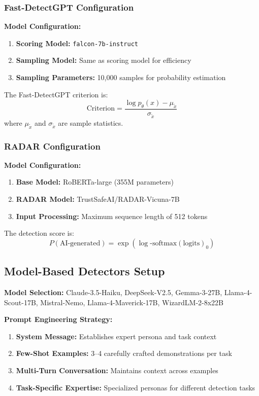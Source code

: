 \subsubsection{Fast-DetectGPT Configuration}
\textbf{Model Configuration:}
\begin{enumerate}[nosep]
    \item \textbf{Scoring Model:} \texttt{falcon-7b-instruct}
    \item \textbf{Sampling Model:} Same as scoring model for efficiency
    \item \textbf{Sampling Parameters:} 10,000 samples for probability estimation
\end{enumerate}

The Fast-DetectGPT criterion is:
\begin{equation}
\text{Criterion} = \frac{\log p_{\theta}(x) - \mu_{\tilde{x}}}{\sigma_{\tilde{x}}}
\end{equation}
where $\mu_{\tilde{x}}$ and $\sigma_{\tilde{x}}$ are sample statistics.

\subsubsection{RADAR Configuration}
\textbf{Model Configuration:}
\begin{enumerate}[nosep]
    \item \textbf{Base Model:} RoBERTa-large (355M parameters)
    \item \textbf{RADAR Model:} TrustSafeAI/RADAR-Vicuna-7B
    \item \textbf{Input Processing:} Maximum sequence length of 512 tokens
\end{enumerate}

The detection score is:
\begin{equation}
P(\text{AI-generated}) = \exp(\log\text{-softmax}(\text{logits})_0)
\end{equation}

\subsection{Model-Based Detectors Setup}

\textbf{Model Selection:} Claude-3.5-Haiku, DeepSeek-V2.5, Gemma-3-27B, Llama-4-Scout-17B, Mistral-Nemo, Llama-4-Maverick-17B, WizardLM-2-8x22B

\textbf{Prompt Engineering Strategy:}
\begin{enumerate}
    \item \textbf{System Message:} Establishes expert persona and task context
    \item \textbf{Few-Shot Examples:} 3--4 carefully crafted demonstrations per task
    \item \textbf{Multi-Turn Conversation:} Maintains context across examples
    \item \textbf{Task-Specific Expertise:} Specialized personas for different detection tasks
\end{enumerate}


